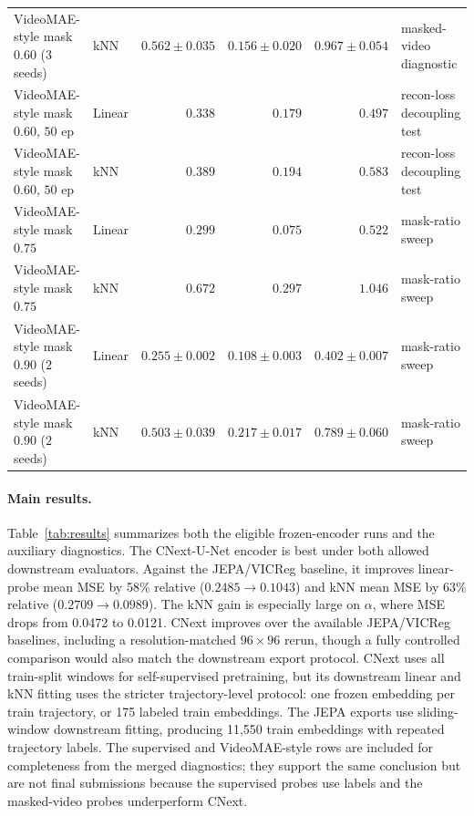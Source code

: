 \documentclass{article}
\begin{document}
\begin{table}[t]
{\begin{tabular}{llrrrl}
VideoMAE-style mask $0.60$ ($3$ seeds) & kNN & $0.562{\pm}0.035$ & $0.156{\pm}0.020$ & $0.967{\pm}0.054$ & masked-video diagnostic \\
VideoMAE-style mask $0.60$, $50$ ep & Linear & $0.338$ & $0.179$ & $0.497$ & recon-loss decoupling test \\
VideoMAE-style mask $0.60$, $50$ ep & kNN & $0.389$ & $0.194$ & $0.583$ & recon-loss decoupling test \\
VideoMAE-style mask $0.75$ & Linear & $0.299$ & $0.075$ & $0.522$ & mask-ratio sweep \\
VideoMAE-style mask $0.75$ & kNN & $0.672$ & $0.297$ & $1.046$ & mask-ratio sweep \\
VideoMAE-style mask $0.90$ ($2$ seeds) & Linear & $0.255{\pm}0.002$ & $0.108{\pm}0.003$ & $0.402{\pm}0.007$ & mask-ratio sweep \\
VideoMAE-style mask $0.90$ ($2$ seeds) & kNN & $0.503{\pm}0.039$ & $0.217{\pm}0.017$ & $0.789{\pm}0.060$ & mask-ratio sweep \\
\bottomrule
\end{tabular}%
}
\end{table}

\paragraph{Main results.}
Table~\ref{tab:results} summarizes both the eligible frozen-encoder runs and the auxiliary diagnostics. The CNext-U-Net encoder is best under both allowed downstream evaluators. Against the JEPA/VICReg baseline, it improves linear-probe mean MSE by 58\% relative ($0.2485 \rightarrow 0.1043$) and kNN mean MSE by 63\% relative ($0.2709 \rightarrow 0.0989$). The kNN gain is especially large on $\alpha$, where MSE drops from 0.0472 to 0.0121. CNext improves over the available JEPA/VICReg baselines, including a resolution-matched $96\times96$ rerun, though a fully controlled comparison would also match the downstream export protocol. CNext uses all train-split windows for self-supervised pretraining, but its downstream linear and kNN fitting uses the stricter trajectory-level protocol: one frozen embedding per train trajectory, or 175 labeled train embeddings. The JEPA exports use sliding-window downstream fitting, producing 11,550 train embeddings with repeated trajectory labels. The supervised and VideoMAE-style rows are included for completeness from the merged diagnostics; they support the same conclusion but are not final submissions because the supervised probes use labels and the masked-video probes underperform CNext.
\end{document}
